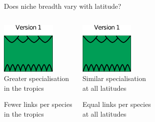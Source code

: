\documentclass{beamer}
\begin{document}
  \begin{frame}{Does niche breadth vary with latitude?}
    \begin{columns}
    \column{.5in}
    \column{1.75in}
      \begin{center}
      \includegraphics[height=1in]{Figures/version1.eps}\\
      \vspace{.5cm}
      Greater specialisation\\in the tropics

      \vspace{.25cm}
      Fewer links per species\\in the tropics

      \end{center}
    \column{.5in}
    \column{1.75in}
      \begin{center}
      \includegraphics[height=1in]{Figures/version1.eps}\\
      \vspace{.5cm}
      Similar specialisation\\at all latitudes

      \vspace{.25cm}
      Equal links per species\\at all latitudes

      \end{center}
    \column{.5in}
    \end{columns}

  \end{frame}
\end{document}

